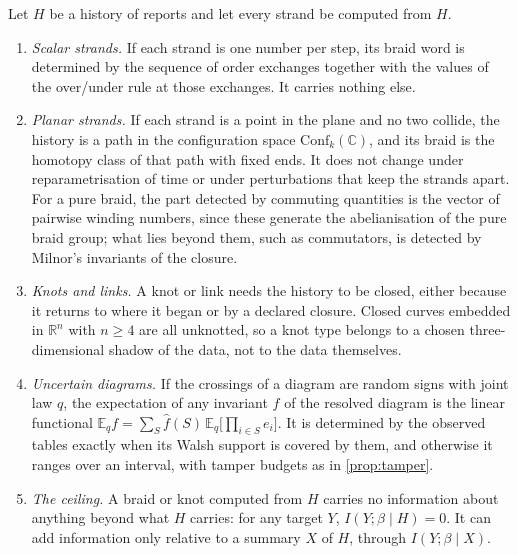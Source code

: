 \documentclass[11pt]{article}
\theoremstyle{definition}\newtheorem{definition}[theorem]{Definition}\newtheorem{remark}[theorem]{Remark}\newtheorem{example}[theorem]{Example}\newtheorem{problem}[theorem]{Open problem}\crefname{problem}{Problem}{Problems}
\begin{document}
\begin{proposition}\label{prop:braidcontent}
Let $H$ be a history of reports and let every strand be computed from $H$.
\begin{enumerate}
\item[(1)] \emph{Scalar strands.} If each strand is one number per step, its braid word is determined by the sequence of order exchanges together with the values of the over/under rule at those exchanges. It carries nothing else.
\item[(2)] \emph{Planar strands.} If each strand is a point in the plane and no two collide, the history is a path in the configuration space $\mathrm{Conf}_k(\mathbb C)$, and its braid is the homotopy class of that path with fixed ends. It does not change under reparametrisation of time or under perturbations that keep the strands apart. For a pure braid, the part detected by commuting quantities is the vector of pairwise winding numbers, since these generate the abelianisation of the pure braid group; what lies beyond them, such as commutators, is detected by Milnor's invariants of the closure.
\item[(3)] \emph{Knots and links.} A knot or link needs the history to be closed, either because it returns to where it began or by a declared closure. Closed curves embedded in $\mathbb R^n$ with $n\ge4$ are all unknotted, so a knot type belongs to a chosen three-dimensional shadow of the data, not to the data themselves.
\item[(4)] \emph{Uncertain diagrams.} If the crossings of a diagram are random signs with joint law $q$, the expectation of any invariant $f$ of the resolved diagram is the linear functional $\mathbb E_qf=\sum_S\hat f(S)\,\mathbb E_q\big[\prod_{i\in S}e_i\big]$. It is determined by the observed tables exactly when its Walsh support is covered by them, and otherwise it ranges over an interval, with tamper budgets as in \cref{prop:tamper}.
\item[(5)] \emph{The ceiling.} A braid or knot computed from $H$ carries no information about anything beyond what $H$ carries: for any target $Y$, $I(Y;\beta\mid H)=0$. It can add information only relative to a summary $X$ of $H$, through $I(Y;\beta\mid X)$.
\end{enumerate}
\end{proposition}
\end{document}
